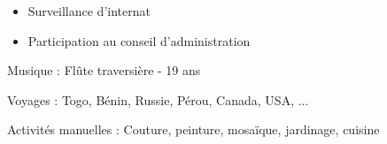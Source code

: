 \divider

\begin{itemize}
\item Surveillance d'internat
\item Participation au conseil d'administration
\end{itemize}



{ \color{emphasis} \faMusic \hspace{0.12cm}  Musique : } 
    Flûte traversière - 19 ans\\
  \vspace{0.25cm}

{\color{emphasis} \faGlobe \hspace{0.12cm} Voyages : }  
    Togo, Bénin, Russie, Pérou, Canada, USA, ...\\
  \vspace{0.25cm}
  
{\color{emphasis} \faCut  \hspace{0.12cm} Activités manuelles : }
    Couture, peinture, mosaïque, jardinage, cuisine
